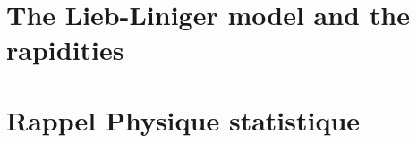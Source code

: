 

\newpage


                
%

\section{The Lieb-Liniger model and the rapidities}
\label{sec:LiebLiniger}



\section{Rappel Physique statistique} 



			            

